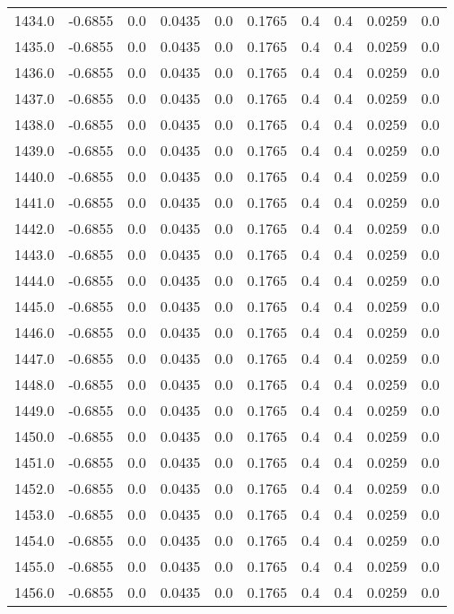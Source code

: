 \begin{longtable}{lrrrrrrrrr}
1434.0 & -0.6855 & 0.0 & 0.0435 & 0.0 & 0.1765 & 0.4 & 0.4 & 0.0259 & 0.0 \\
1435.0 & -0.6855 & 0.0 & 0.0435 & 0.0 & 0.1765 & 0.4 & 0.4 & 0.0259 & 0.0 \\
1436.0 & -0.6855 & 0.0 & 0.0435 & 0.0 & 0.1765 & 0.4 & 0.4 & 0.0259 & 0.0 \\
1437.0 & -0.6855 & 0.0 & 0.0435 & 0.0 & 0.1765 & 0.4 & 0.4 & 0.0259 & 0.0 \\
1438.0 & -0.6855 & 0.0 & 0.0435 & 0.0 & 0.1765 & 0.4 & 0.4 & 0.0259 & 0.0 \\
1439.0 & -0.6855 & 0.0 & 0.0435 & 0.0 & 0.1765 & 0.4 & 0.4 & 0.0259 & 0.0 \\
1440.0 & -0.6855 & 0.0 & 0.0435 & 0.0 & 0.1765 & 0.4 & 0.4 & 0.0259 & 0.0 \\
1441.0 & -0.6855 & 0.0 & 0.0435 & 0.0 & 0.1765 & 0.4 & 0.4 & 0.0259 & 0.0 \\
1442.0 & -0.6855 & 0.0 & 0.0435 & 0.0 & 0.1765 & 0.4 & 0.4 & 0.0259 & 0.0 \\
1443.0 & -0.6855 & 0.0 & 0.0435 & 0.0 & 0.1765 & 0.4 & 0.4 & 0.0259 & 0.0 \\
1444.0 & -0.6855 & 0.0 & 0.0435 & 0.0 & 0.1765 & 0.4 & 0.4 & 0.0259 & 0.0 \\
1445.0 & -0.6855 & 0.0 & 0.0435 & 0.0 & 0.1765 & 0.4 & 0.4 & 0.0259 & 0.0 \\
1446.0 & -0.6855 & 0.0 & 0.0435 & 0.0 & 0.1765 & 0.4 & 0.4 & 0.0259 & 0.0 \\
1447.0 & -0.6855 & 0.0 & 0.0435 & 0.0 & 0.1765 & 0.4 & 0.4 & 0.0259 & 0.0 \\
1448.0 & -0.6855 & 0.0 & 0.0435 & 0.0 & 0.1765 & 0.4 & 0.4 & 0.0259 & 0.0 \\
1449.0 & -0.6855 & 0.0 & 0.0435 & 0.0 & 0.1765 & 0.4 & 0.4 & 0.0259 & 0.0 \\
1450.0 & -0.6855 & 0.0 & 0.0435 & 0.0 & 0.1765 & 0.4 & 0.4 & 0.0259 & 0.0 \\
1451.0 & -0.6855 & 0.0 & 0.0435 & 0.0 & 0.1765 & 0.4 & 0.4 & 0.0259 & 0.0 \\
1452.0 & -0.6855 & 0.0 & 0.0435 & 0.0 & 0.1765 & 0.4 & 0.4 & 0.0259 & 0.0 \\
1453.0 & -0.6855 & 0.0 & 0.0435 & 0.0 & 0.1765 & 0.4 & 0.4 & 0.0259 & 0.0 \\
1454.0 & -0.6855 & 0.0 & 0.0435 & 0.0 & 0.1765 & 0.4 & 0.4 & 0.0259 & 0.0 \\
1455.0 & -0.6855 & 0.0 & 0.0435 & 0.0 & 0.1765 & 0.4 & 0.4 & 0.0259 & 0.0 \\
1456.0 & -0.6855 & 0.0 & 0.0435 & 0.0 & 0.1765 & 0.4 & 0.4 & 0.0259 & 0.0 \\

\end{longtable}

